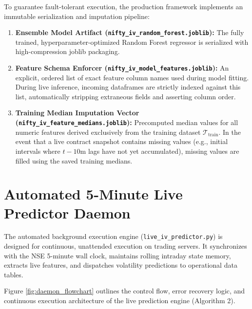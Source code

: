 To guarantee fault-tolerant execution, the production framework implements an immutable serialization and imputation pipeline:
\begin{enumerate}
    \item \textbf{Ensemble Model Artifact (\texttt{nifty\_iv\_random\_forest.joblib}):} The fully trained, hyperparameter-optimized Random Forest regressor is serialized with high-compression joblib packaging.
    \item \textbf{Feature Schema Enforcer (\texttt{nifty\_iv\_model\_features.joblib}):} An explicit, ordered list of exact feature column names used during model fitting. During live inference, incoming dataframes are strictly indexed against this list, automatically stripping extraneous fields and asserting column order.
    \item \textbf{Training Median Imputation Vector (\texttt{nifty\_iv\_feature\_medians.joblib}):} Precomputed median values for all numeric features derived exclusively from the training dataset $\mathcal{T}_{\text{train}}$. In the event that a live contract snapshot contains missing values (e.g., initial intervals where $t-10\text{m}$ lags have not yet accumulated), missing values are filled using the saved training medians.
\end{enumerate}

\section{Automated 5-Minute Live Predictor Daemon}
\label{sec:live_predictor_daemon}

The automated background execution engine (\texttt{live\_iv\_predictor.py}) is designed for continuous, unattended execution on trading servers. It synchronizes with the NSE 5-minute wall clock, maintains rolling intraday state memory, extracts live features, and dispatches volatility predictions to operational data tables.

Figure \ref{fig:daemon_flowchart} outlines the control flow, error recovery logic, and continuous execution architecture of the live prediction engine (Algorithm 2).

